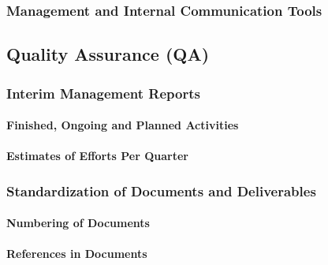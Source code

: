 \documentclass[
  11pt,
]{article}
\begin{document}
\hypertarget{management-and-internal-communication-tools}{%
\subsubsection{Management and Internal Communication
Tools}\label{management-and-internal-communication-tools}}

\hypertarget{quality-assurance-qa}{%
\subsection{Quality Assurance (QA)}\label{quality-assurance-qa}}

\hypertarget{interim-management-reports}{%
\subsubsection{Interim Management
Reports}\label{interim-management-reports}}

\hypertarget{finished-ongoing-and-planned-activities}{%
\paragraph{Finished, Ongoing and Planned
Activities}\label{finished-ongoing-and-planned-activities}}

\hypertarget{estimates-of-efforts-per-quarter}{%
\paragraph{Estimates of Efforts Per
Quarter}\label{estimates-of-efforts-per-quarter}}

\hypertarget{standardization-of-documents-and-deliverables}{%
\subsubsection{Standardization of Documents and
Deliverables}\label{standardization-of-documents-and-deliverables}}

\hypertarget{numbering-of-documents}{%
\paragraph{Numbering of Documents}\label{numbering-of-documents}}

\hypertarget{references-in-documents}{%
\paragraph{References in Documents}\label{references-in-documents}}
\end{document}
